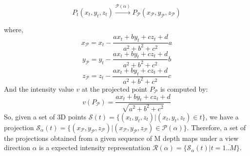\documentclass[review]{elsarticle}
\begin{document}
\begin{equation}
	P_t(x_t,y_t,z_t)\xrightarrow{\mathcal{P}(\alpha)}P_\mathcal{P}(x_\mathcal{P},y_\mathcal{P},z_\mathcal{P})
\end{equation}

where,
\begin{equation}
	x_\mathcal{P} = x_t - \frac{ax_t + by_t + cz_t + d}{a^2 + b^2 + c^2}a
\end{equation}
\begin{equation}
	y_\mathcal{P} = y_t - \frac{ax_t + by_t + cz_t + d}{a^2 + b^2 + c^2}b
\end{equation}
\begin{equation}
	z_\mathcal{P} = z_t - \frac{ax_t + by_t + cz_t + d}{a^2 + b^2 + c^2}c
\end{equation}
And the intensity value $v$ at the projected point $P_\mathcal{P}$ is computed by:
\begin{equation}
	v(P_\mathcal{P}) = \frac{ax_t + by_t + cz_t + d}{\sqrt{a^2 + b^2 + c^2}}
\end{equation}
So, given a set of 3D points $\mathcal{S}(t) = \{(x_t,y_t,z_t)\vert(x_t,y_t,z_t) \in t\}$, we have a projection $\mathcal{S}_\alpha(t) = \{(x_\mathcal{P},y_\mathcal{P},z_\mathcal{P})\vert(x_\mathcal{P},y_\mathcal{P},z_\mathcal{P}) \in \mathcal{P}(\alpha)\}$. Therefore, a set of the projections obtained from a given sequence of M depth maps under a view direction $\alpha$ is a expected intensity representation $\mathcal{R}(\alpha) = \{\mathcal{S}_\alpha(t) \vert t=\overline{1..M}\}$.
\end{document}
